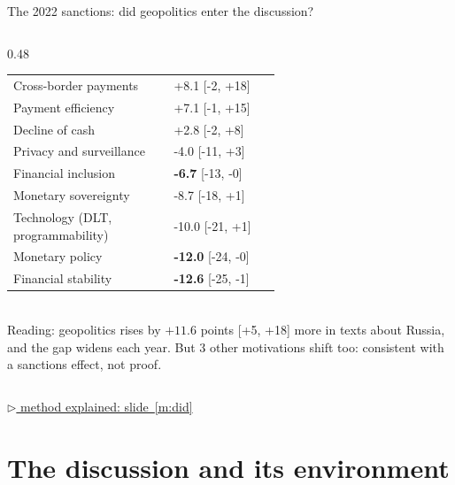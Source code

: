 \documentclass[aspectratio=169,10pt]{beamer}
\newcommand{\method}[1]{\hfill\hyperref[#1]{\tiny\textcolor{c4}{$\triangleright$ method explained: slide~\ref*{#1}}}}
\begin{document}
\begin{frame}{The 2022 sanctions: did geopolitics enter the discussion?}
\begin{columns}[T]
\begin{column}{0.48\textwidth}
\begin{tabular}{@{}p{0.6\linewidth}l@{}}
Cross-border payments & +8.1 \tiny[-2, +18] \\
Payment efficiency & +7.1 \tiny[-1, +15] \\
Decline of cash & +2.8 \tiny[-2, +8] \\
Privacy and surveillance & -4.0 \tiny[-11, +3] \\
Financial inclusion & \textbf{-6.7} \tiny[-13, -0] \\
Monetary sovereignty & -8.7 \tiny[-18, +1] \\
Technology (DLT, programmability) & -10.0 \tiny[-21, +1] \\
Monetary policy & \textbf{-12.0} \tiny[-24, -0] \\
Financial stability & \textbf{-12.6} \tiny[-25, -1] \\
\bottomrule\end{tabular}\\[4pt]
\small \alert{Reading}: geopolitics rises by $+11.6$ points [+5, +18] more in texts about Russia, and the gap widens each year. But 3 other motivations shift too: \alert{consistent with} a sanctions effect, not proof.
\end{column}
\end{columns}
\method{m:did}
\end{frame}

\section{The discussion and its environment}
\end{document}
